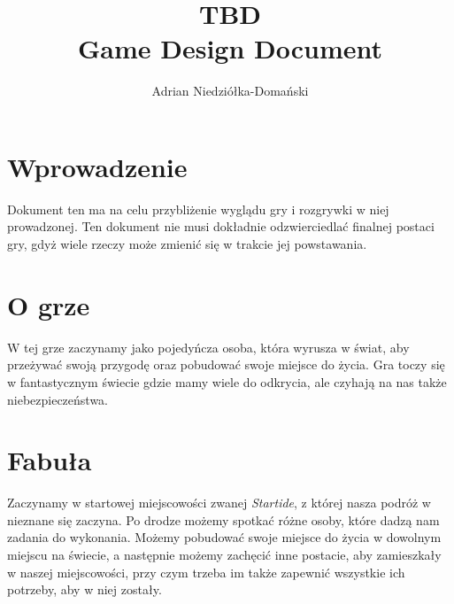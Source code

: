 \documentclass[12pt]{article}
\author{Adrian Niedziółka-Domański}
\title {TBD\\
	\large Game Design Document}
\begin{document}
	\maketitle
	\pagebreak
	\tableofcontents
	\pagebreak
	
	\section{Wprowadzenie}
	Dokument ten ma na celu przybliżenie wyglądu gry i rozgrywki w niej prowadzonej. Ten dokument nie musi dokładnie odzwierciedlać finalnej postaci gry, gdyż wiele rzeczy może zmienić się w trakcie jej powstawania.
	
	\section{O grze}
	W tej grze zaczynamy jako pojedyńcza osoba, która wyrusza w świat, aby przeżywać swoją przygodę oraz pobudować swoje miejsce do życia. Gra toczy się w fantastycznym świecie gdzie mamy wiele do odkrycia, ale czyhają na nas także niebezpieczeństwa.
	
	\section{Fabuła}
	Zaczynamy w startowej miejscowości zwanej \textit{Startide}, z której nasza podróż w nieznane się zaczyna. Po drodze możemy spotkać różne osoby, które dadzą nam zadania do wykonania. Możemy pobudować swoje miejsce do życia w dowolnym miejscu na świecie, a następnie możemy zachęcić inne postacie, aby zamieszkały w naszej miejscowości, przy czym trzeba im także zapewnić wszystkie ich potrzeby, aby w niej zostały.
	
\end{document}
